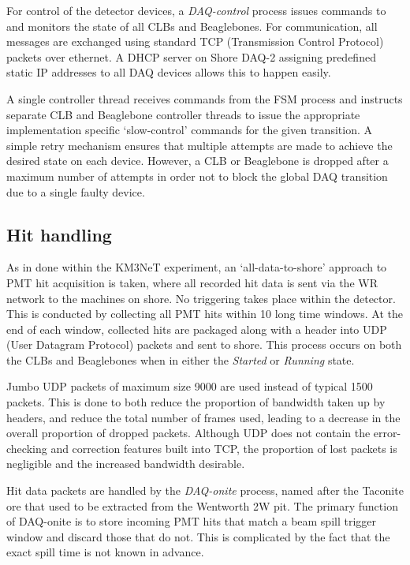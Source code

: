 For control of the detector devices, a \emph{DAQ-control} process issues commands to and monitors
the state of all CLBs and Beaglebones. For communication, all messages are exchanged using
standard TCP (Transmission Control Protocol) packets over ethernet. A DHCP server on Shore DAQ-2
assigning predefined static IP addresses to all DAQ devices allows this to happen easily. 

A single controller thread receives commands from the FSM process and instructs separate CLB and
Beaglebone controller threads to issue the appropriate implementation specific `slow-control'
commands for the given transition. A simple retry mechanism ensures that multiple attempts are
made to achieve the desired state on each device. However, a CLB or Beaglebone is dropped after a
maximum number of attempts in order not to block the global DAQ transition due to a single faulty
device.

\subsection{Hit handling} %
\label{sec:daq_soft_hits} %

As in done within the KM3NeT experiment, an `all-data-to-shore' approach to PMT hit acquisition is
taken, where all recorded hit data is sent via the WR network to the machines on shore. No
triggering takes place within the detector. This is conducted by collecting all PMT hits within
\unit{10}{} long time windows. At the end of each window, collected hits are packaged
along with a header into UDP (User Datagram Protocol) packets and sent to shore. This process
occurs on both the CLBs and Beaglebones when in either the \emph{Started} or \emph{Running} state.

Jumbo UDP packets of maximum size \unit{9000}{} are used instead of typical
\unit{1500}{} packets. This is done to both reduce the proportion of bandwidth taken
up by headers, and reduce the total number of frames used, leading to a decrease in the overall
proportion of dropped packets. Although UDP does not contain the error-checking and correction
features built into TCP, the proportion of lost packets is negligible and the increased bandwidth
desirable.

Hit data packets are handled by the \emph{DAQ-onite} process, named after the Taconite ore that
used to be extracted from the Wentworth 2W pit. The primary function of DAQ-onite is to store
incoming PMT hits that match a \numi beam spill trigger window and discard those that do not. This
is complicated by the fact that the exact \numi spill time is not known in advance.

